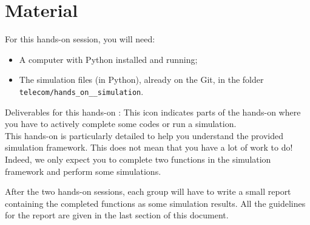 \section*{Material}

\begin{comment}[couleur = gray!20, arrondi = 0.2, logo=\bcinfo]{}
\vspace{0.2cm}
\end{comment}
For this hands-on session, you will need:
\begin{itemize}
    \item A computer with Python installed and running;
\item The simulation files (in Python), already on the Git, in the folder \texttt{telecom/hands\_on\_\_simulation}.
\end{itemize}
\begin{bclogo}[couleur = gray!20, arrondi = 0.2, logo=\bcinfo]{Deliverables for this hands-on}
\bccrayon: This icon indicates parts of the hands-on where you have to actively complete some codes or run a simulation.\\

This hands-on is particularly detailed to help you understand the provided simulation framework. This does not mean that you have a lot of work to do! Indeed, we only expect you to complete two functions in the simulation framework and perform some simulations.

After the two hands-on sessions, each group will have to write a small report containing the completed functions as some simulation results. All the guidelines for the report are given in the last section of this document.

\end{bclogo}
